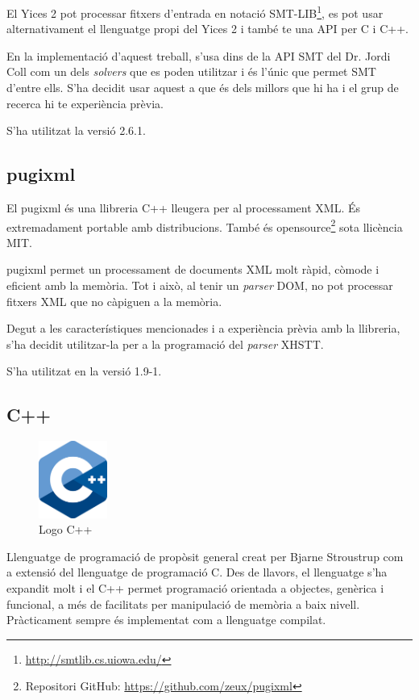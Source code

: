 \documentclass[11pt,a4paper,twoside]{report}
\begin{document}
  El Yices 2 pot processar fitxers d'entrada en notació SMT-LIB\footnote{\url{http://smtlib.cs.uiowa.edu/}}, es pot usar alternativament el llenguatge propi del Yices 2 i també te una API per C i C++.
  
  En la implementació d'aquest treball, s'usa dins de la API SMT del Dr. Jordi Coll com un dels \textit{solvers} que es poden utilitzar i és l'únic que permet SMT d'entre ells. S'ha decidit usar aquest a que és dels millors que hi ha i el grup de recerca hi te experiència prèvia. 

  S'ha utilitzat la versió 2.6.1.

  \subsection{pugixml}
  El pugixml és una llibreria C++ lleugera per al processament XML. És extremadament portable amb distribucions. També és opensource\footnote{Repositori GitHub: \url{https://github.com/zeux/pugixml}} sota llicència MIT.

  pugixml permet un processament de documents XML molt ràpid, còmode i eficient amb la memòria. Tot i això, al tenir un \textit{parser} DOM, no pot processar fitxers XML que no càpiguen a la memòria.
  
  Degut a les característiques mencionades i a experiència prèvia amb la llibreria, s'ha decidit utilitzar-la per a la programació del \textit{parser} XHSTT. 

  S'ha utilitzat en la versió 1.9-1.

  \subsection{C++}
  \begin{figure}[ht!]
    \centering
    \includegraphics[width=0.2\textwidth]{Diagrames/cpp.png}
    \caption{Logo C++}
    \label{fig:cpp}
  \end{figure}
  
  Llenguatge de programació de propòsit general creat per Bjarne Stroustrup com a extensió del llenguatge de programació C. 
  Des de llavors, el llenguatge s'ha expandit molt i el C++ permet programació orientada a objectes, genèrica i funcional, a més de facilitats per manipulació de memòria a baix nivell. 
  Pràcticament sempre és implementat com a llenguatge compilat.
\end{document}

